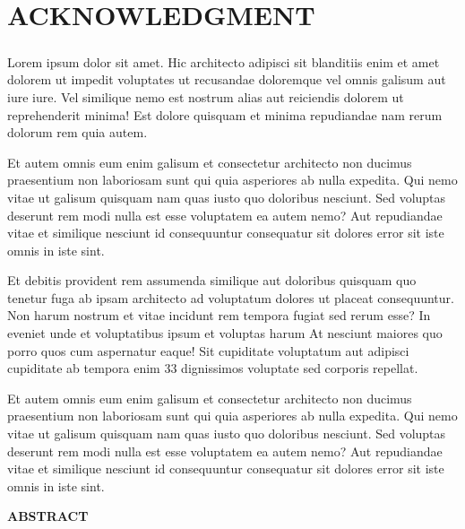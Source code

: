 \documentclass[a4paper,12pt]{report}
\begin{document}
\chapter*{\large{ACKNOWLEDGMENT}}
\thispagestyle{empty}
\paragraph{}
Lorem ipsum dolor sit amet. Hic architecto adipisci sit blanditiis enim et amet dolorem ut impedit voluptates ut recusandae doloremque vel omnis galisum aut iure iure. Vel similique nemo est nostrum alias aut reiciendis dolorem ut reprehenderit minima! Est dolore quisquam et minima repudiandae nam rerum dolorum rem quia autem. 


\par Et autem omnis eum enim galisum et consectetur architecto non ducimus praesentium non laboriosam sunt qui quia asperiores ab nulla expedita. Qui nemo vitae ut galisum quisquam nam quas iusto quo doloribus nesciunt. Sed voluptas deserunt rem modi nulla est esse voluptatem ea autem nemo? Aut repudiandae vitae et similique nesciunt id consequuntur consequatur sit dolores error sit iste omnis in iste sint. 

\par Et debitis provident rem assumenda similique aut doloribus quisquam quo tenetur fuga ab ipsam architecto ad voluptatum dolores ut placeat consequuntur. Non harum nostrum et vitae incidunt rem tempora fugiat sed rerum esse? In eveniet unde et voluptatibus ipsum et voluptas harum At nesciunt maiores quo porro quos cum aspernatur eaque! Sit cupiditate voluptatum aut adipisci cupiditate ab tempora enim 33 dignissimos voluptate sed corporis repellat. 

\par Et autem omnis eum enim galisum et consectetur architecto non ducimus praesentium non laboriosam sunt qui quia asperiores ab nulla expedita. Qui nemo vitae ut galisum quisquam nam quas iusto quo doloribus nesciunt. Sed voluptas deserunt rem modi nulla est esse voluptatem ea autem nemo? Aut repudiandae vitae et similique nesciunt id consequuntur consequatur sit dolores error sit iste omnis in iste sint. 

\newpage

\begin{center}
\large \textbf{ABSTRACT}
\end{center}
\end{document}
